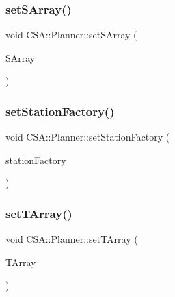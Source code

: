 \mbox{\label{classCSA_1_1Planner_af19efcec5cc9196698108f30fa55029c}} 
\subsubsection{\texorpdfstring{set\+S\+Array()}{setSArray()}}
{\footnotesize\ttfamily void C\+S\+A\+::\+Planner\+::set\+S\+Array (\begin{DoxyParamCaption}\item[{const Q\+Map$<$ Q\+Url, Q\+List$<$ \mbox{\hyperlink{classCSA_1_1StationStopProfile}{C\+S\+A\+::\+Station\+Stop\+Profile}} $\ast$$>$ $>$ \&}]{S\+Array }\end{DoxyParamCaption})\hspace{0.3cm}{\ttfamily [private]}}

\mbox{\label{classCSA_1_1Planner_a67b39227b11c5d49052c48141ad256ac}} 
\subsubsection{\texorpdfstring{set\+Station\+Factory()}{setStationFactory()}}
{\footnotesize\ttfamily void C\+S\+A\+::\+Planner\+::set\+Station\+Factory (\begin{DoxyParamCaption}\item[{\mbox{\hyperlink{classCSA_1_1StationFactory}{C\+S\+A\+::\+Station\+Factory}} $\ast$}]{station\+Factory }\end{DoxyParamCaption})\hspace{0.3cm}{\ttfamily [private]}}

\mbox{\label{classCSA_1_1Planner_a376be1acb09685a367131b290af81910}} 
\subsubsection{\texorpdfstring{set\+T\+Array()}{setTArray()}}
{\footnotesize\ttfamily void C\+S\+A\+::\+Planner\+::set\+T\+Array (\begin{DoxyParamCaption}\item[{const Q\+Map$<$ Q\+Url, \mbox{\hyperlink{classCSA_1_1TrainProfile}{C\+S\+A\+::\+Train\+Profile}} $\ast$$>$ \&}]{T\+Array }\end{DoxyParamCaption})\hspace{0.3cm}{\ttfamily [private]}}

